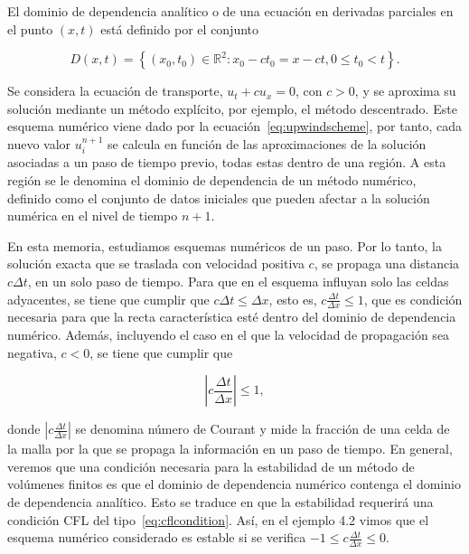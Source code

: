 \begin{definition}
  El dominio de dependencia analítico o de una ecuación en derivadas
  parciales en el punto $\left(x,t\right)$ está definido por el
  conjunto

  \begin{equation*}
    D\left(x,t\right)=
    \left\{
    \left(x_{0},t_{0}\right)\in\mathbb{R}^{2}:
    x_{0}-ct_{0}=x-ct,
    0\leq t_{0}<t
    \right\}.
  \end{equation*}
\end{definition}

Se considera la ecuación de transporte, $u_t+cu_x=0$, con $c>0$, y se
aproxima su solución mediante un método explícito, por ejemplo, el
método descentrado.
Este esquema numérico viene dado por la
ecuación~\eqref{eq:upwindscheme}, por tanto, cada nuevo valor
$u^{n+1}_{i}$ se calcula en función de las aproximaciones de la
solución asociadas a un paso de tiempo previo, todas estas dentro de
una región.
A esta región se le denomina el dominio de dependencia de un método
numérico, definido como el conjunto de datos iniciales que pueden
afectar a la solución numérica en el nivel de tiempo $n+1$.

En esta memoria, estudiamos esquemas numéricos de un paso.
Por lo tanto, la solución exacta que se traslada con velocidad
positiva $c$, se propaga una distancia $c\Delta t$, en un solo paso
de tiempo.
Para que en el esquema inﬂuyan solo las celdas adyacentes, se tiene
que cumplir que $c\Delta t\leq\Delta x$, esto es,
$c\frac{\Delta t}{\Delta x}\leq 1$, que es condición necesaria para
que la recta característica esté dentro del dominio de dependencia
numérico.
Además, incluyendo el caso en el que la velocidad de propagación sea
negativa, $c<0$, se tiene que cumplir que

\begin{equation}\label{eq:cflcondition}
  \left|
  c\frac{\Delta t}{\Delta x}
  \right|\leq
  1,
\end{equation}

donde
\begin{math}
  \left|
  c\frac{\Delta t}{\Delta x}
  \right|
\end{math}
se denomina número de Courant y mide la fracción de una celda de la
malla por la que se propaga la información en un paso de tiempo.
En general, veremos que una condición necesaria para la estabilidad
de un método de volúmenes finitos es que el dominio de dependencia
numérico contenga el dominio de dependencia analítico.
Esto se traduce en que la estabilidad requerirá una condición CFL del
tipo~\eqref{eq:cflcondition}.
Así, en el ejemplo 4.2 vimos que el esquema numérico considerado es
estable si se verifica
\begin{math}
  -1\leq
  c\frac{\Delta t}{\Delta x}\leq
  0
\end{math}.

